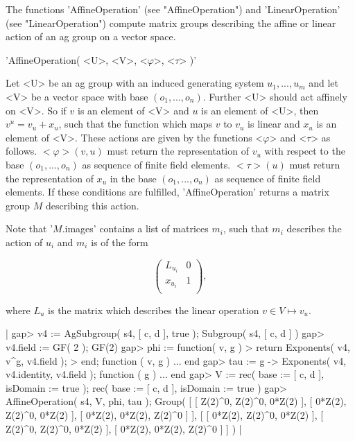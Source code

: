 The    functions      'AffineOperation'  (see    "AffineOperation")   and
'LinearOperation'   (see   "LinearOperation")  compute   matrix    groups
describing the affine or linear action of an ag group on a vector space.


'AffineOperation( <U>, <V>, <$\varphi$>, <$\tau$> )'

Let <U> be an ag group with an induced generating  system $u_1, ..., u_m$
and let <V> be a  vector space with base $(o_1, ...,  o_n)$.  Further <U>
should act affinely on <V>.  So if $v$ is an element of <V> and $u$ is an
element of <U>, then $v^u = v_u + x_u$, such that the function which maps
$v$ to $v_u$ is linear and $x_u$ is an element of <V>.  These actions are
given by the functions <$\varphi$> and <$\tau$> as  follows.  $<\varphi>(
v, u)$ must return  the representation of  $v_u$ with respect to the base
$(o_1, ...,  o_n)$ as sequence of  finite field elements.   $<\tau>( u )$
must return the representation of $x_u$ in  the base $(o_1, ..., o_n)$ as
sequence of finite field elements.   If  these conditions are  fulfilled,
'AffineOperation' returns a matrix group $M$ describing this action.

Note that '$M$.images' contains a list of matrices $m_i$, such that $m_i$
describes the action of $u_i$ and $m_i$ is of the form

\begin{displaymath}
    \left(
    \begin{array}{cc}
        L_{u_i} & 0 \\
        x_{u_i} & 1 \\
    \end{array}
    \right),
\end{displaymath}

where  $L_u$ is the  matrix which describes   the linear  operation $v\in
V\mapsto v_u$.

|    gap> v4 := AgSubgroup( s4, [ c, d ], true );
    Subgroup( s4, [ c, d ] )
    gap> v4.field := GF( 2 );
    GF(2)
    gap> phi := function( v, g )
    >      return Exponents( v4, v^g, v4.field );
    >    end;
    function ( v, g ) ... end
    gap> tau := g -> Exponents( v4, v4.identity, v4.field );
    function ( g ) ... end
    gap> V := rec( base := [ c, d ], isDomain := true );
    rec(
      base := [ c, d ],
      isDomain := true )
    gap> AffineOperation( s4, V, phi, tau );
    Group( [ [ Z(2)^0, Z(2)^0, 0*Z(2) ], [ 0*Z(2), Z(2)^0, 0*Z(2) ],
      [ 0*Z(2), 0*Z(2), Z(2)^0 ] ],
    [ [ 0*Z(2), Z(2)^0, 0*Z(2) ], [ Z(2)^0, Z(2)^0, 0*Z(2) ],
      [ 0*Z(2), 0*Z(2), Z(2)^0 ] ] ) |

